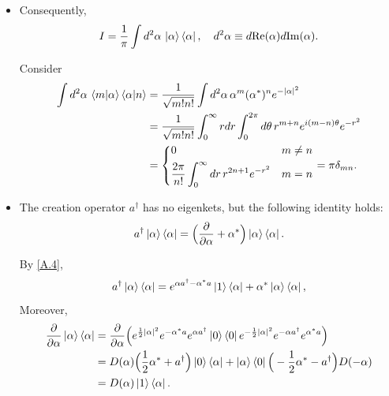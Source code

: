 \documentclass[10pt, a4paper]{article}
\numberwithin{equation}{section}
\begin{document}
\begin{itemize}
		\item Consequently,
		\begin{equation}
			I = \frac{1}{\pi} \int d^2 \alpha \, \ket{\alpha} \bra{\alpha}, \quad d^2 \alpha \equiv d\mathrm{Re}(\alpha) d\mathrm{Im}(\alpha).
		\end{equation}
		
		\begin{tcolorbox}[title=Proof:]
			Consider
			\begin{align}
				\int d^2 \alpha \, \braket{m | \alpha} \braket{\alpha | n} &= \frac{1}{\sqrt{m! n!}} \int d^2 \alpha \, \alpha^m (\alpha^*)^n e^{- |\alpha|^2} \notag \\
				&= \frac{1}{\sqrt{m! n!}} \int_0^\infty r dr \int_0^{2 \pi} d\theta \, r^{m + n} e^{i (m - n) \theta} e^{- r^2} \notag \\
				&= \begin{dcases}
					0 & m \neq n \\
					\frac{2 \pi}{n!} \int_0^\infty dr \, r^{2 n + 1} e^{- r^2} & m = n
				\end{dcases} = \pi \delta_{m n}.
			\end{align}
		\end{tcolorbox}
		
		\item The creation operator $a^\dag$ has no eigenkets, but the following identity holds:
		\begin{equation}
			a^\dag \ket{\alpha} \bra{\alpha} = \Big( \frac{\partial}{\partial \alpha} + \alpha^* \Big) \ket{\alpha} \bra{\alpha}.
		\end{equation}
		
		\begin{tcolorbox}[title=Proof:]
			By \eqref{A.4},
			\begin{equation}
				a^\dag \ket{\alpha} \bra{\alpha} = e^{\alpha a^\dag - \alpha^* a} \ket{1} \bra{\alpha} + \alpha^* \ket{\alpha} \bra{\alpha},
			\end{equation}
			Moreover,
			\begin{align}
				\frac{\partial}{\partial \alpha} \ket{\alpha} \bra{\alpha} &= \frac{\partial}{\partial \alpha} \Big( e^{\frac{1}{2} |\alpha|^2} e^{- \alpha^* a} e^{\alpha a^\dag} \ket{0} \bra{0} e^{- \frac{1}{2} |\alpha|^2} e^{- \alpha a^\dag} e^{\alpha^* a} \Big) \notag \\
				&= D(\alpha) \Big( \frac{1}{2} \alpha^* + a^\dag \Big) \ket{0} \bra{\alpha} + \ket{\alpha} \bra{0} \Big( - \frac{1}{2} \alpha^* - a^\dag \Big) D(- \alpha) \notag \\
				&= D(\alpha) \ket{1} \bra{\alpha}.
			\end{align}
		\end{tcolorbox}
	\end{itemize}
	
\end{document}
